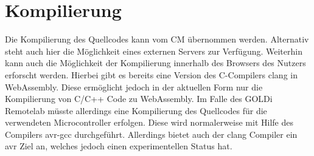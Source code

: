 \section{Kompilierung} \label{kompilierung}

Die Kompilierung des Quellcodes kann vom CM übernommen werden. Alternativ steht auch hier die Möglichkeit eines externen Servers zur Verfügung. Weiterhin kann auch die Möglichkeit der Kompilierung innerhalb des Browsers des Nutzers erforscht werden. Hierbei gibt es bereits eine Version des C-Compilers clang in WebAssembly. Diese ermöglicht jedoch in der aktuellen Form nur die Kompilierung von C/C++ Code zu WebAssembly. Im Falle des GOLDi Remotelab müsste allerdings eine Kompilierung des Quellcodes für die verwendeten Microcontroller erfolgen. Diese wird normalerweise mit Hilfe des Compilers avr-gcc durchgeführt. Allerdings bietet auch der clang Compiler ein avr Ziel an, welches jedoch einen experimentellen Status hat.